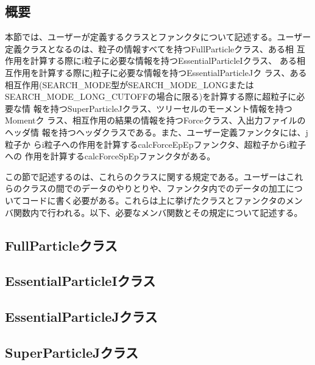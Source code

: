 \subsection{概要}

本節では、ユーザーが定義するクラスとファンクタについて記述する。ユーザー
定義クラスとなるのは、粒子の情報すべてを持つFullParticleクラス、ある相
互作用を計算する際にi粒子に必要な情報を持つEssentialParticleIクラス、
ある相互作用を計算する際にj粒子に必要な情報を持つEssentialParticleJク
ラス、ある相互作用(SEARCH\_MODE型がSEARCH\_MODE\_LONGまたは
SEARCH\_MODE\_LONG\_CUTOFFの場合に限る)を計算する際に超粒子に必要な情
報を持つSuperParticleJクラス、ツリーセルのモーメント情報を持つMomentク
ラス、相互作用の結果の情報を持つForceクラス、入出力ファイルのヘッダ情
報を持つヘッダクラスである。また、ユーザー定義ファンクタには、j粒子か
らi粒子への作用を計算するcalcForceEpEpファンクタ、超粒子からi粒子への
作用を計算するcalcForceSpEpファンクタがある。

この節で記述するのは、これらのクラスに関する規定である。ユーザーはこれ
らのクラスの間でのデータのやりとりや、ファンクタ内でのデータの加工につ
いてコードに書く必要がある。これらは上に挙げたクラスとファンクタのメン
バ関数内で行われる。以下、必要なメンバ関数とその規定について記述する。

\subsection{FullParticleクラス}
\label{sec:fullparticle}



\subsection{EssentialParticleIクラス}
\label{sec:essentialparticlei}



\subsection{EssentialParticleJクラス}
\label{sec:essentialparticlej}



\subsection{SuperParticleJクラス}
\label{sec:superparticlej}

